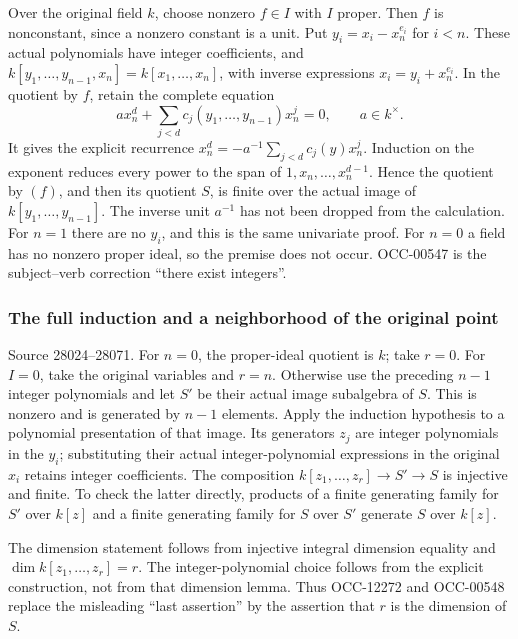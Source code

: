 Over the original field \(k\), choose nonzero \(f\in I\) with \(I\) proper. Then \(f\) is nonconstant, since a nonzero constant is a unit. Put \(y_i=x_i-x_n^{e_i}\) for \(i<n\). These actual polynomials have integer coefficients, and \(k[y_1,\ldots,y_{n-1},x_n]=k[x_1,\ldots,x_n]\), with inverse expressions \(x_i=y_i+x_n^{e_i}\). In the quotient by \(f\), retain the complete equation \[
 a x_n^d+\sum_{j<d}c_j(y_1,\ldots,y_{n-1})x_n^j=0,\qquad a\in k^\times.
\] It gives the explicit recurrence \(x_n^d=-a^{-1}\sum_{j<d}c_j(y)x_n^j\). Induction on the exponent reduces every power to the span of \(1,x_n,\ldots,x_n^{d-1}\). Hence the quotient by \((f)\), and then its quotient \(S\), is finite over the actual image of \(k[y_1,\ldots,y_{n-1}]\). The inverse unit \(a^{-1}\) has not been dropped from the calculation. For \(n=1\) there are no \(y_i\), and this is the same univariate proof. For \(n=0\) a field has no nonzero proper ideal, so the premise does not occur. OCC-00547 is the subject--verb correction ``there exist integers''.

\subsubsection{The full induction and a neighborhood of the original point}\label{the-full-induction-and-a-neighborhood-of-the-original-point}

Source 28024--28071. For \(n=0\), the proper-ideal quotient is \(k\); take \(r=0\). For \(I=0\), take the original variables and \(r=n\). Otherwise use the preceding \(n-1\) integer polynomials and let \(S'\) be their actual image subalgebra of \(S\). This is nonzero and is generated by \(n-1\) elements. Apply the induction hypothesis to a polynomial presentation of that image. Its generators \(z_j\) are integer polynomials in the \(y_i\); substituting their actual integer-polynomial expressions in the original \(x_i\) retains integer coefficients. The composition \(k[z_1,\ldots,z_r]\to S'\to S\) is injective and finite. To check the latter directly, products of a finite generating family for \(S'\) over \(k[z]\) and a finite generating family for \(S\) over \(S'\) generate \(S\) over \(k[z]\).

The dimension statement follows from injective integral dimension equality and \(\dim k[z_1,\ldots,z_r]=r\). The integer-polynomial choice follows from the explicit construction, not from that dimension lemma. Thus OCC-12272 and OCC-00548 replace the misleading ``last assertion'' by the assertion that \(r\) is the dimension of \(S\).

